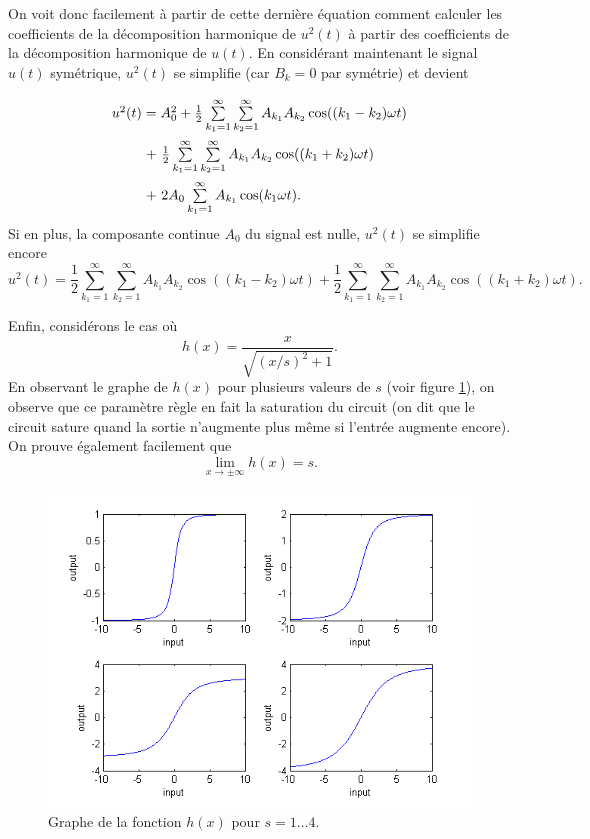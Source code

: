On voit donc facilement à partir de cette dernière équation comment calculer
les coefficients de la décomposition harmonique de $u^2(t)$ à partir des
coefficients de la décomposition harmonique de $u(t)$. En considérant
maintenant le signal $u(t)$ symétrique, $u^2(t)$ se simplifie
(car $B_k = 0$ par symétrie) et devient
\[\arraycolsep=1.4pt\def\arraystretch{2.2}
	\begin{array}{cl}
		u^2(t) 	&= A^2_0 + \frac{1}{2}\sum\limits_{k_1=1}^\infty\sum\limits_{k_2=1}^\infty A_{k_1}A_{k_2}\cos((k_1-k_2)\omega t)\\
						&+~ \frac{1}{2}\sum\limits_{k_1=1}^\infty\sum\limits_{k_2=1}^\infty A_{k_1}A_{k_2}\cos((k_1+k_2)\omega t) \\
						&+~ 2A_0\sum\limits_{k_1=1}^\infty A_{k_1}\cos(k_1\omega t).
	\end{array}
\]
Si en plus, la composante continue $A_0$ du signal est nulle,
$u^2(t)$ se simplifie encore
\[ u^2(t) = \frac{1}{2}\sum\limits_{k_1=1}^\infty\sum\limits_{k_2=1}^\infty A_{k_1}A_{k_2}\cos((k_1-k_2)\omega t)
+ \frac{1}{2}\sum\limits_{k_1=1}^\infty\sum\limits_{k_2=1}^\infty A_{k_1}A_{k_2}\cos((k_1+k_2)\omega t). \]


Enfin, considérons le cas où 
\[ h(x) = \frac{x}{\sqrt{(x/s)^2+1}}.\]
En observant le graphe de $h(x)$ pour plusieurs
valeurs de $s$ (voir figure \ref{fig:non-linear-transfer}),
on observe que ce paramètre règle en fait la saturation du circuit
(on dit que le circuit sature quand la sortie n'augmente plus
même si l'entrée augmente encore). 
On prouve également facilement que
\[ \lim_{x\to\pm\infty} h(x) = s.\]

\begin{figure}[ht]
	\centering
	\includegraphics[scale=0.6]{img/non-linear-transfer.png}
	\caption{Graphe de la fonction $h(x)$ pour $s=1\dots4$.}
	\label{fig:non-linear-transfer}
\end{figure}

